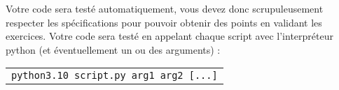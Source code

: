 



\noindent Votre code sera testé automatiquement, vous devez donc scrupuleusement respecter les spécifications pour pouvoir obtenir des points en validant les exercices.
Votre code sera testé en appelant chaque script avec l'interpréteur python (et éventuellement un ou des arguments) :

\medskip

\begin{tabular}{l}
\texttt{python3.10 script.py arg1 arg2 [...]}\\
\end{tabular}

\bigskip


